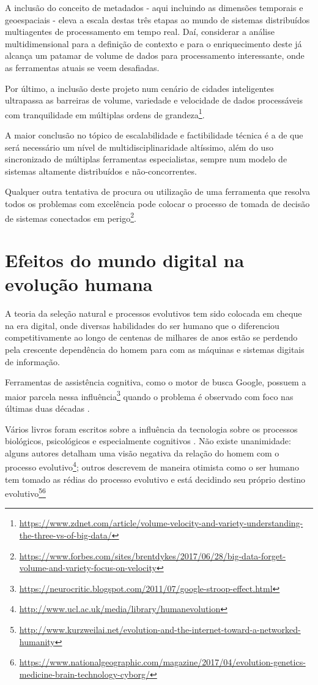 A inclusão do conceito de metadados - aqui incluindo as dimensões temporais e geoespaciais - eleva a escala destas três etapas ao mundo de sistemas distribuídos multiagentes de processamento em tempo real. Daí, considerar a análise multidimensional para a definição de contexto e para o enriquecimento deste já alcança um patamar de volume de dados para processamento interessante, onde as ferramentas atuais se veem desafiadas. 

Por último, a inclusão deste projeto num cenário de cidades inteligentes ultrapassa as barreiras de volume, variedade e velocidade de dados processáveis com tranquilidade em múltiplas ordens de grandeza\footnote{\url{https://www.zdnet.com/article/volume-velocity-and-variety-understanding-the-three-vs-of-big-data/}}.

A maior conclusão no tópico de escalabilidade e factibilidade técnica é a de que será necessário um nível de multidisciplinaridade altíssimo, além do uso sincronizado de múltiplas ferramentas especialistas, sempre num modelo de sistemas altamente distribuídos e não-concorrentes.

Qualquer outra tentativa de procura ou utilização de uma ferramenta que resolva todos os problemas com excelência pode colocar o processo de tomada de decisão de sistemas conectados em perigo\footnote{\url{https://www.forbes.com/sites/brentdykes/2017/06/28/big-data-forget-volume-and-variety-focus-on-velocity}}.

\section{Efeitos do mundo digital na evolução humana}

A teoria da seleção natural e processos evolutivos tem sido colocada em cheque na era digital, onde diversas habilidades do ser humano que o diferenciou competitivamente ao longo de centenas de milhares de anos estão se perdendo pela crescente dependência do homem para com as máquinas e sistemas digitais de informação.

Ferramentas de assistência cognitiva, como o motor de busca Google, possuem a maior parcela nessa influência\footnote{\url{https://neurocritic.blogspot.com/2011/07/google-stroop-effect.html}} quando o problema é observado com foco nas últimas duas décadas \cite{Sparrow2011GoogleEO}. 

Vários livros foram escritos sobre a influência da tecnologia sobre os processos biológicos, psicológicos e especialmente cognitivos \cite{theshallows, theglasscage}. Não existe unanimidade: alguns autores detalham uma visão negativa da relação do homem com o processo evolutivo\footnote{\url{http://www.ucl.ac.uk/media/library/humanevolution}}; outros descrevem de maneira otimista como o ser humano tem tomado as rédias do processo evolutivo e está decidindo seu próprio destino evolutivo\footnote{\url{http://www.kurzweilai.net/evolution-and-the-internet-toward-a-networked-humanity}}\footnote{\url{https://www.nationalgeographic.com/magazine/2017/04/evolution-genetics-medicine-brain-technology-cyborg/}}